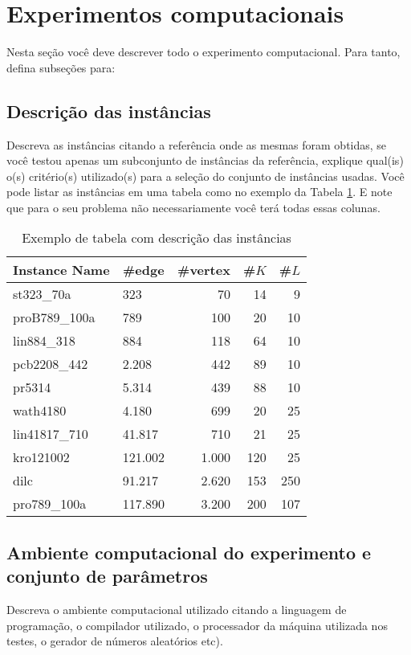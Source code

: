 \documentclass[12pt,fleqn]{article}
\begin{document}
\section{Experimentos computacionais}
\label{secResultados}
Nesta seção você deve descrever todo o experimento computacional. Para tanto, defina subseções para:

\subsection{Descrição das instâncias}
\label{subSecInstancias}
Descreva as instâncias citando a referência onde as mesmas foram obtidas, se você testou apenas um subconjunto de instâncias da referência, explique qual(is) o(s) critério(s) utilizado(s) para a seleção do conjunto de instâncias usadas. Você pode listar as instâncias em uma tabela como no exemplo da Tabela \ref{tabInstancias}. E note que para o seu problema não necessariamente você terá todas essas colunas.

\begin{table}[!h]
\centering
\begin{tabular}{l|l|r|r|r}
\hline
\multicolumn{1}{c|}{\textbf{Instance Name}} & \multicolumn{1}{c|}{\textbf{\#edge}} & \multicolumn{1}{c|}{\textbf{\#vertex}} & \multicolumn{1}{c|}{\textbf{\#$K$}} & \multicolumn{1}{c}{\textbf{\#$L$}}  \\ \hline
st323\_70a & 323 & 70 & 14 & 9   \\ \hline
proB789\_100a & 789 & 100 & 20 & 10  \\ \hline
lin884\_318 & 884 & 118 & 64 & 10   \\ \hline \hline
pcb2208\_442 & 2.208  & 442 & 89 & 10  \\ \hline
pr5314 & 5.314 & 439 & 88 & 10  \\ \hline
wath4180 & 4.180 & 699 & 20 & 25\\ \hline
lin41817\_710 & 41.817 & 710 & 21 & 25  \\ \hline \hline
kro121002 & 121.002 & 1.000 & 120 & 25  \\ \hline
dilc & 91.217 & 2.620 & 153 & 250  \\ \hline
pro789\_100a & 117.890 & 3.200 & 200 & 107  \\ \hline
\end{tabular}
\caption{Exemplo de tabela com descrição das instâncias}
\label{tabInstancias}
\end{table}


\subsection{Ambiente computacional do experimento e conjunto de parâmetros}
\label{subSecAmbiente}
Descreva o ambiente computacional utilizado citando a linguagem de programação, o compilador utilizado, o processador da máquina utilizada nos testes, o gerador de números aleatórios etc).
\end{document}
